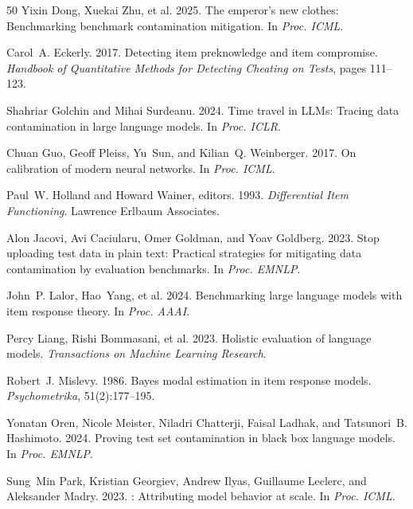 \documentclass[11pt,a4paper]{article}
\begin{document}
\begin{thebibliography}{50}
Yixin Dong, Xuekai Zhu, et al. 2025.
\newblock The emperor's new clothes: Benchmarking benchmark contamination mitigation.
\newblock In \emph{Proc. ICML}.

Carol~A. Eckerly. 2017.
\newblock Detecting item preknowledge and item compromise.
\newblock \emph{Handbook of Quantitative Methods for Detecting Cheating on Tests}, pages 111--123.

Shahriar Golchin and Mihai Surdeanu. 2024.
\newblock Time travel in {LLM}s: Tracing data contamination in large language models.
\newblock In \emph{Proc. ICLR}.

Chuan Guo, Geoff Pleiss, Yu~Sun, and Kilian~Q. Weinberger. 2017.
\newblock On calibration of modern neural networks.
\newblock In \emph{Proc. ICML}.

Paul~W. Holland and Howard Wainer, editors. 1993.
\newblock \emph{Differential Item Functioning}.
\newblock Lawrence Erlbaum Associates.

Alon Jacovi, Avi Caciularu, Omer Goldman, and Yoav Goldberg. 2023.
\newblock Stop uploading test data in plain text: Practical strategies for mitigating data contamination by evaluation benchmarks.
\newblock In \emph{Proc. EMNLP}.

John~P. Lalor, Hao~Yang, et al. 2024.
\newblock Benchmarking large language models with item response theory.
\newblock In \emph{Proc. AAAI}.

Percy Liang, Rishi Bommasani, et al. 2023.
\newblock Holistic evaluation of language models.
\newblock \emph{Transactions on Machine Learning Research}.

Robert~J. Mislevy. 1986.
\newblock Bayes modal estimation in item response models.
\newblock \emph{Psychometrika}, 51(2):177--195.

Yonatan Oren, Nicole Meister, Niladri Chatterji, Faisal Ladhak, and Tatsunori~B. Hashimoto. 2024.
\newblock Proving test set contamination in black box language models.
\newblock In \emph{Proc. EMNLP}.

Sung~Min Park, Kristian Georgiev, Andrew Ilyas, Guillaume Leclerc, and Aleksander Madry. 2023.
: Attributing model behavior at scale.
\newblock In \emph{Proc. ICML}.


\end{thebibliography}
\end{document}
